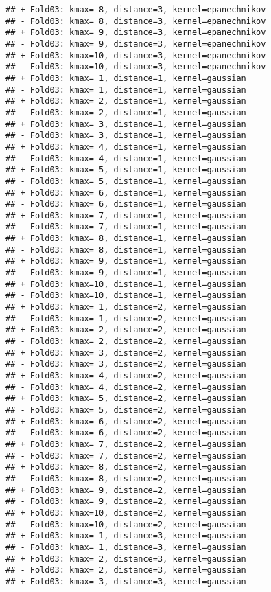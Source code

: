 \documentclass[
]{article}
\begin{document}
\begin{verbatim}
## + Fold03: kmax= 8, distance=3, kernel=epanechnikov 
## - Fold03: kmax= 8, distance=3, kernel=epanechnikov 
## + Fold03: kmax= 9, distance=3, kernel=epanechnikov 
## - Fold03: kmax= 9, distance=3, kernel=epanechnikov 
## + Fold03: kmax=10, distance=3, kernel=epanechnikov 
## - Fold03: kmax=10, distance=3, kernel=epanechnikov 
## + Fold03: kmax= 1, distance=1, kernel=gaussian 
## - Fold03: kmax= 1, distance=1, kernel=gaussian 
## + Fold03: kmax= 2, distance=1, kernel=gaussian 
## - Fold03: kmax= 2, distance=1, kernel=gaussian 
## + Fold03: kmax= 3, distance=1, kernel=gaussian 
## - Fold03: kmax= 3, distance=1, kernel=gaussian 
## + Fold03: kmax= 4, distance=1, kernel=gaussian 
## - Fold03: kmax= 4, distance=1, kernel=gaussian 
## + Fold03: kmax= 5, distance=1, kernel=gaussian 
## - Fold03: kmax= 5, distance=1, kernel=gaussian 
## + Fold03: kmax= 6, distance=1, kernel=gaussian 
## - Fold03: kmax= 6, distance=1, kernel=gaussian 
## + Fold03: kmax= 7, distance=1, kernel=gaussian 
## - Fold03: kmax= 7, distance=1, kernel=gaussian 
## + Fold03: kmax= 8, distance=1, kernel=gaussian 
## - Fold03: kmax= 8, distance=1, kernel=gaussian 
## + Fold03: kmax= 9, distance=1, kernel=gaussian 
## - Fold03: kmax= 9, distance=1, kernel=gaussian 
## + Fold03: kmax=10, distance=1, kernel=gaussian 
## - Fold03: kmax=10, distance=1, kernel=gaussian 
## + Fold03: kmax= 1, distance=2, kernel=gaussian 
## - Fold03: kmax= 1, distance=2, kernel=gaussian 
## + Fold03: kmax= 2, distance=2, kernel=gaussian 
## - Fold03: kmax= 2, distance=2, kernel=gaussian 
## + Fold03: kmax= 3, distance=2, kernel=gaussian 
## - Fold03: kmax= 3, distance=2, kernel=gaussian 
## + Fold03: kmax= 4, distance=2, kernel=gaussian 
## - Fold03: kmax= 4, distance=2, kernel=gaussian 
## + Fold03: kmax= 5, distance=2, kernel=gaussian 
## - Fold03: kmax= 5, distance=2, kernel=gaussian 
## + Fold03: kmax= 6, distance=2, kernel=gaussian 
## - Fold03: kmax= 6, distance=2, kernel=gaussian 
## + Fold03: kmax= 7, distance=2, kernel=gaussian 
## - Fold03: kmax= 7, distance=2, kernel=gaussian 
## + Fold03: kmax= 8, distance=2, kernel=gaussian 
## - Fold03: kmax= 8, distance=2, kernel=gaussian 
## + Fold03: kmax= 9, distance=2, kernel=gaussian 
## - Fold03: kmax= 9, distance=2, kernel=gaussian 
## + Fold03: kmax=10, distance=2, kernel=gaussian 
## - Fold03: kmax=10, distance=2, kernel=gaussian 
## + Fold03: kmax= 1, distance=3, kernel=gaussian 
## - Fold03: kmax= 1, distance=3, kernel=gaussian 
## + Fold03: kmax= 2, distance=3, kernel=gaussian 
## - Fold03: kmax= 2, distance=3, kernel=gaussian 
## + Fold03: kmax= 3, distance=3, kernel=gaussian 

\end{verbatim}
\end{document}
